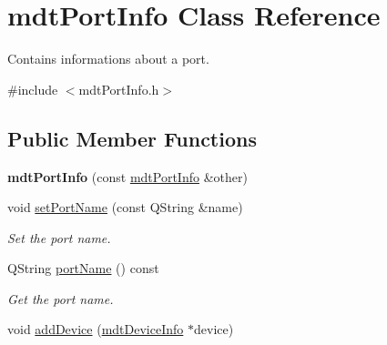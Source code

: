 \hypertarget{classmdt_port_info}{
\section{mdtPortInfo Class Reference}
\label{classmdt_port_info}
}


Contains informations about a port.  




{\ttfamily \#include $<$mdtPortInfo.h$>$}

\subsection*{Public Member Functions}
\begin{DoxyCompactItemize}
\item 
\hypertarget{classmdt_port_info_a77029d8f37cfb8efcc7c427df3db0f66}{
{\bfseries mdtPortInfo} (const \hyperlink{classmdt_port_info}{mdtPortInfo} \&other)}
\label{classmdt_port_info_a77029d8f37cfb8efcc7c427df3db0f66}

\item 
\hypertarget{classmdt_port_info_a5de494f20c68f61332761909756f5a33}{
void \hyperlink{classmdt_port_info_a5de494f20c68f61332761909756f5a33}{setPortName} (const QString \&name)}
\label{classmdt_port_info_a5de494f20c68f61332761909756f5a33}

\begin{DoxyCompactList}\small\item\em Set the port name. \end{DoxyCompactList}\item 
\hypertarget{classmdt_port_info_ad456aac33dccc9b0583ed8aa4796cdf0}{
QString \hyperlink{classmdt_port_info_ad456aac33dccc9b0583ed8aa4796cdf0}{portName} () const }
\label{classmdt_port_info_ad456aac33dccc9b0583ed8aa4796cdf0}

\begin{DoxyCompactList}\small\item\em Get the port name. \end{DoxyCompactList}\item 
\hypertarget{classmdt_port_info_a2a8d6603b7e134ffd9e11900ece88a61}{
void \hyperlink{classmdt_port_info_a2a8d6603b7e134ffd9e11900ece88a61}{addDevice} (\hyperlink{classmdt_device_info}{mdtDeviceInfo} $\ast$device)}
\label{classmdt_port_info_a2a8d6603b7e134ffd9e11900ece88a61}


\end{DoxyCompactItemize}
